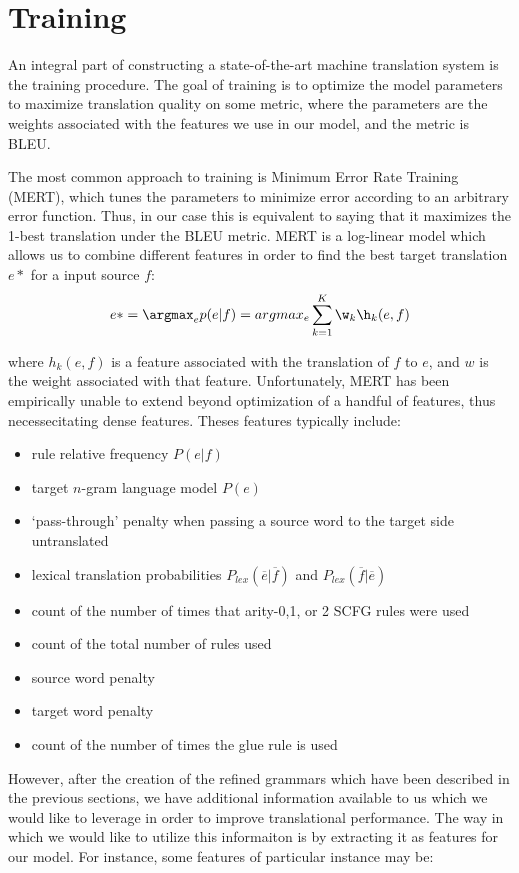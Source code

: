 \chapter{Training}

An integral part of constructing a state-of-the-art machine translation system is the training procedure. The goal of training is to optimize the model parameters to maximize translation quality on some metric, where the parameters are the weights associated with the features we use in our model, and the metric is BLEU. 

The most common approach to training is Minimum Error Rate Training (MERT), which tunes the parameters to minimize error according to an arbitrary error function. Thus, in our case this is equivalent to saying that it maximizes the 1-best translation under the BLEU metric. MERT is a log-linear model which allows us to combine different features in order to find the best target translation $e*$ for a input source $f$:
$$e* = \argmax_e p(e|f) = argmax_e \sum_{k=1}^K \w_k\h_k(e,f)$$

where $h_k(e,f)$ is a feature associated with the translation of $f$ to $e$, and $w$ is the weight associated with that feature. Unfortunately, MERT has been empirically unable to extend beyond optimization of a handful of features, thus necessecitating dense features. Theses features typically include:

\begin{itemize}
\item rule relative frequency $P(e|f)$
\item target $n$-gram language model $P(e)$
\item `pass-through' penalty when passing a source word to the target side untranslated
\item lexical translation probabilities $P_{lex}(\overline{e}|\overline{f})$ and $P_{lex}(\overline{f}|\overline{e})$
\item count of the number of times that arity-0,1, or 2 SCFG rules were used 
\item count of the total number of rules used
\item source word penalty
\item target word penalty
\item count of the number of times the glue rule is used 
\end{itemize} 

However, after the creation of the refined grammars which have been described in the previous sections, we have additional information available to us which we would like to leverage in order to improve translational performance. The way in which we would like to utilize this informaiton is by extracting it as features for our model. For instance, some features of particular instance may be:

